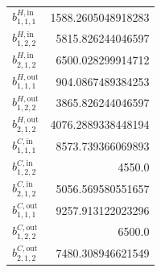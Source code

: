 \documentclass{article}%
\begin{document}
\begin{multicols*}{3}
\begin{supertabular}{lr}
	$b_{1,1,1}^{H,\text{in}}$ & 1588.2605048918283 \\%
	$b_{1,2,2}^{H,\text{in}}$ & 5815.826244046597 \\%
	$b_{2,1,2}^{H,\text{in}}$ & 6500.028299914712 \\%
	$b_{1,1,1}^{H,\text{out}}$ & 904.0867489384253 \\%
	$b_{1,2,2}^{H,\text{out}}$ & 3865.826244046597 \\%
	$b_{2,1,2}^{H,\text{out}}$ & 4076.2889338448194 \\%
	$b_{1,1,1}^{C,\text{in}}$ & 8573.739366069893 \\%
	$b_{1,2,2}^{C,\text{in}}$ & 4550.0 \\%
	$b_{2,1,2}^{C,\text{in}}$ & 5056.569580551657 \\%
	$b_{1,1,1}^{C,\text{out}}$ & 9257.913122023296 \\%
	$b_{1,2,2}^{C,\text{out}}$ & 6500.0 \\%
	$b_{2,1,2}^{C,\text{out}}$ & 7480.308946621549 \\%
\end{supertabular}%
\end{multicols*}%
\clearpage%
\end{document}
